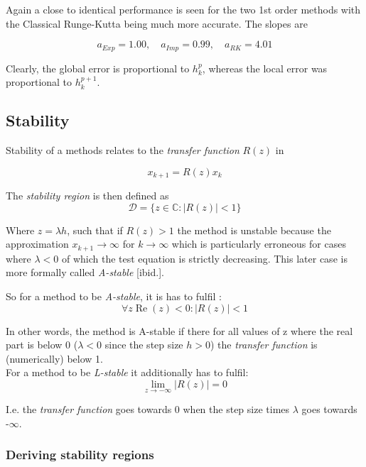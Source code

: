 Again a close to identical performance is seen for the two 1st order methods with the Classical Runge-Kutta being much more accurate. The slopes are

$$
a_{Exp} = 1.00, \quad a_{Imp} = 0.99, \quad a_{RK} = 4.01
$$

Clearly, the global error is proportional to $h_{k}^{p}$, whereas the local error was proportional to $h_{k}^{p+1}$.

\subsection{Stability}
Stability of a methods relates to the \textit{transfer function} $R(z)$ in

\begin{equation}
    x_{k+1}=R(z) x_{k}
\end{equation}

The \textit{stability region} is then defined as \cite{JrgensenScientificEquationsc}
$$ \mathcal{D}=\{z \in \mathbb{C}:|R(z)|<1\} $$

Where $z = \lambda h$, such that if $R(z) > 1$ the method is unstable because the approximation $x_{k+1} \to \infty$ for $k \to \infty$ which is particularly erroneous for cases where $\lambda < 0$ of which the test equation is strictly decreasing. This later case is more formally called \textit{A-stable} [ibid.].

So for a method to be\textit{ A-stable}, it is has to fulfil \cite{JrgensenRunge-KuttaControl}:
\begin{equation}
    \forall z \operatorname{Re}(z)<0  :   |R(z)|<1
\end{equation}

In other words, the method is A-stable if there for all values of z where the real part is below 0 (\iff $\lambda < 0$ since the step size $h > 0$) the \textit{transfer function} is (numerically) below 1.
\\

For a method to be \textit{L-stable} it additionally has to fulfil:
\begin{equation}
\lim _{z \rightarrow-\infty}|R(z)|=0
\end{equation}

I.e. the \textit{transfer function} goes towards 0 when the step size times $\lambda$ goes towards -$\infty$.

\subsubsection*{Deriving stability regions}

